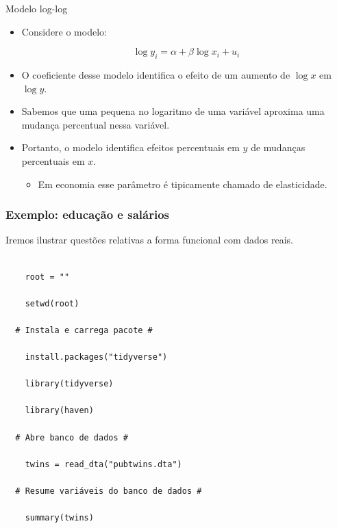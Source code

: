 \documentclass[10pt,slides,xcolor=pdftex,dvipsnames,table]{beamer}
\begin{document}
\begin{frame}{Modelo log-log}

\begin{itemize}\itemsep1.2em

    \item Considere o modelo:
    
    $$ \log y_i = \alpha + \beta \log x_i + u_i $$
    
    \item O coeficiente desse modelo identifica o efeito de um aumento de $\log x$ em $\log y$.     
    
    \item Sabemos que uma pequena no logaritmo de uma variável aproxima uma mudança percentual nessa variável.
    
    \item Portanto, o modelo identifica efeitos percentuais em $y$ de mudanças percentuais em $x$.
    \begin{itemize}
    \item Em economia esse parâmetro é tipicamente chamado de elasticidade.
    \end{itemize}
 
    \end{itemize}

\end{frame}


\begin{frame}[fragile]
	\frametitle{Exemplo: educação e salários}

\vspace{0.5cm}

Iremos ilustrar questões relativas a forma funcional com dados reais.

\begin{lstlisting}

    root = ""

    setwd(root)
    
  # Instala e carrega pacote #
  
  	install.packages("tidyverse")
  	
  	library(tidyverse)    	
  	
  	library(haven)  
    
  # Abre banco de dados #  
    
    twins = read_dta("pubtwins.dta")
    
  # Resume variáveis do banco de dados #
  
  	summary(twins)

\end{lstlisting}

\end{frame}
\end{document}

